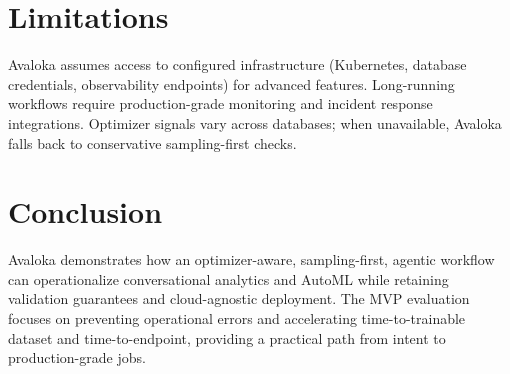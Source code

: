 \documentclass{article} %
\begin{document}
\section{Limitations}
Avaloka assumes access to configured infrastructure (Kubernetes, database credentials, observability endpoints) for
advanced features. Long-running workflows require production-grade monitoring and incident response integrations.
Optimizer signals vary across databases; when unavailable, Avaloka falls back to conservative sampling-first checks.

\section{Conclusion}
Avaloka demonstrates how an optimizer-aware, sampling-first, agentic workflow can operationalize conversational
analytics and AutoML while retaining validation guarantees and cloud-agnostic deployment. The MVP evaluation focuses
on preventing operational errors and accelerating time-to-trainable dataset and time-to-endpoint, providing a practical
path from intent to production-grade jobs.
\end{document}
